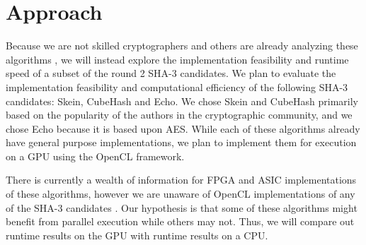 \section*{Approach}
Because we are not skilled cryptographers and others are already analyzing these algorithms \cite{Sha3Zoo}, we will instead explore the implementation feasibility and runtime speed of a subset of the round 2 SHA-3 candidates.
We plan to evaluate the implementation feasibility and computational efficiency of the following SHA-3 candidates: Skein, CubeHash and Echo.
We chose Skein and CubeHash primarily based on the popularity of the authors in the cryptographic community, and we chose Echo because it is based upon AES.
While each of these algorithms already have general purpose implementations, we plan to implement them for execution on a GPU using the OpenCL framework.

There is currently a wealth of information for FPGA and ASIC implementations of these algorithms, however we are unaware of OpenCL implementations of any of the SHA-3 candidates \cite{Sha3Hardware}.
Our hypothesis is that some of these algorithms might benefit from parallel execution while others may not.
Thus, we will compare out runtime results on the GPU with runtime results on a CPU.